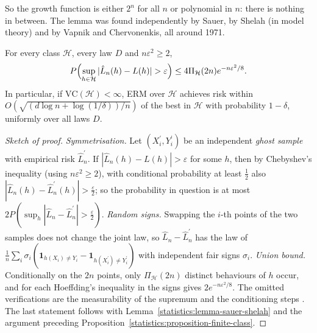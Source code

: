 So the growth function is either $2^n$ for all $n$ or polynomial in $n$: there is nothing in between. The lemma was found independently by Sauer, by Shelah (in model theory) and by Vapnik and Chervonenkis, all around 1971.

\begin{theorem}\label{statistics:theorem-vc}
For every class $\mathcal{H}$, every law $D$ and $n\varepsilon^2 \geq 2$,
\[
P\Bigl(\sup_{h \in \mathcal{H}}|\hat L_n(h) - L(h)| > \varepsilon\Bigr) \leq 4\Pi_{\mathcal{H}}(2n)e^{-n\varepsilon^2/8}.
\]
In particular, if $\mathrm{VC}(\mathcal{H}) < \infty$, ERM over $\mathcal{H}$ achieves risk within $O(\sqrt{(d\log n + \log(1/\delta))/n})$ of the best in $\mathcal{H}$ with probability $1 - \delta$, uniformly over all laws $D$.
\end{theorem}

\begin{proof}[Sketch of proof]
\emph{Symmetrisation.} Let $(X_i^{\prime}, Y_i^{\prime})$ be an independent \emph{ghost sample} with empirical risk $\hat L_n^{\prime}$. If $|\hat L_n(h) - L(h)| > \varepsilon$ for some $h$, then by Chebyshev's inequality (using $n\varepsilon^2 \geq 2$), with conditional
probability at least $\frac12$ also $|\hat L_n(h) - \hat L_n^{\prime}(h)| > \frac\varepsilon2$; so the probability in question is at most $2P(\sup_h|\hat L_n - \hat L_n^{\prime}| > \frac\varepsilon2)$. \emph{Random signs.} Swapping the $i$-th points of the
two samples does not change the joint law, so $\hat L_n - \hat L_n^{\prime}$ has the law of $\frac1n\sum_i\sigma_i(\mathbf{1}_{h(X_i) \neq Y_i} - \mathbf{1}_{h(X_i^{\prime}) \neq Y_i^{\prime}})$ with independent fair signs $\sigma_i$. \emph{Union bound.}
Conditionally on the $2n$ points, only $\Pi_{\mathcal{H}}(2n)$ distinct behaviours of $h$ occur, and for each Hoeffding's inequality in the signs gives $2e^{-n\varepsilon^2/8}$. The omitted verifications are the measurability of the
supremum and the conditioning steps \cite{devroye-gyorfi-lugosi}. The last statement follows with Lemma~\ref{statistics:lemma-sauer-shelah} and the argument preceding Proposition~\ref{statistics:proposition-finite-class}.
\end{proof}

